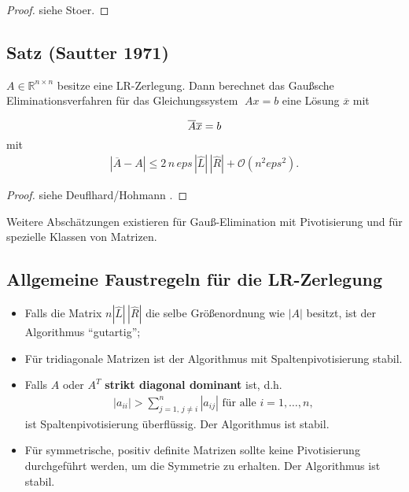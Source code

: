 \documentclass[ngerman,fontsize=11pt, paper=a4, parskip=half, titlepage=true, toc=bib]{scrbook}
\newcommand{\R}{\mathds{R}}
\begin{document}
  \begin{proof}
    siehe Stoer\cite{stoerbulirsch}.
  \end{proof}
  
  
  \subsection{Satz (Sautter 1971)}
  $ A \in \R^{n\times n}$ besitze eine LR-Zerlegung.  Dann berechnet das
  Gaußsche Eliminationsverfahren für das Gleichungssystem
  $\;  A  x =  b$ eine Lösung $\overline{ x}$ mit 
  \begin{gather*} \overline{ A} \overline{ x}  =   b \vspace*{-2ex} \end{gather*}
  mit
  \begin{gather*} 
    | \overline{ A} - A |  \leq  2 \, n \, eps \,
    |\hat{L}| \, | \hat{R}| + \mathcal{O}( n^2 eps^2).
  \end{gather*}
  
  \begin{proof}
    siehe Deuflhard/Hohmann \cite{deuflhardhohmann}.
  \end{proof}
  
  Weitere Abschätzungen existieren für Gauß-Elimination mit 
  Pivotisierung und für spezielle Klassen von Matrizen.
  
  \subsection{Allgemeine Faustregeln für die LR-Zerlegung}
  \begin{itemize}
  \item Falls die Matrix $n | \hat{ L} | \,  |\hat{ R}|$ die
    selbe Größenordnung wie $| A|$ besitzt, ist der
    Algorithmus \enquote{gutartig};
  \item Für tridiagonale Matrizen  ist der Algorithmus mit
    Spaltenpivotisierung stabil.
  \item Falls $ A$ oder $ A^T$  \textbf{strikt diagonal
      dominant} ist, d.h. 
    \begin{gather*}
      | a_{ii} | > \sum\limits_{j=1 ,\, j \not = i}^{n} | a_{ij}| 
      \mbox{ für alle } i = 1, \ldots, n,
    \end{gather*}
    ist Spaltenpivotisierung überflüssig. Der Algorithmus ist stabil.
  \item Für symmetrische, positiv definite Matrizen sollte keine Pivotisierung
    durchgeführt werden, um die Symmetrie zu erhalten.
    Der Algorithmus ist stabil.
  \end{itemize}
  
\end{document}

